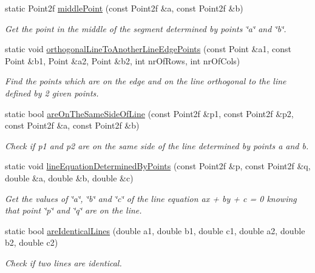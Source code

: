 \begin{DoxyCompactItemize}
static Point2f \hyperlink{classmultiscale_1_1Geometry2D_a178c13bdb5cc3f26de7d5e9fd05781f5}{middle\-Point} (const Point2f \&a, const Point2f \&b)
\begin{DoxyCompactList}\small\item\em Get the point in the middle of the segment determined by points \char`\"{}a\char`\"{} and \char`\"{}b\char`\"{}. \end{DoxyCompactList}\item 
static void \hyperlink{classmultiscale_1_1Geometry2D_a3da27e8cecb0a0d2733afa85d356a912}{orthogonal\-Line\-To\-Another\-Line\-Edge\-Points} (const Point \&a1, const Point \&b1, Point \&a2, Point \&b2, int nr\-Of\-Rows, int nr\-Of\-Cols)
\begin{DoxyCompactList}\small\item\em Find the points which are on the edge and on the line orthogonal to the line defined by 2 given points. \end{DoxyCompactList}\item 
static bool \hyperlink{classmultiscale_1_1Geometry2D_a828b7b579420ac06dabd7c4ba4d081ae}{are\-On\-The\-Same\-Side\-Of\-Line} (const Point2f \&p1, const Point2f \&p2, const Point2f \&a, const Point2f \&b)
\begin{DoxyCompactList}\small\item\em Check if p1 and p2 are on the same side of the line determined by points a and b. \end{DoxyCompactList}\item 
static void \hyperlink{classmultiscale_1_1Geometry2D_a6d72740d7f1b2441b0829c0f0c6a6853}{line\-Equation\-Determined\-By\-Points} (const Point2f \&p, const Point2f \&q, double \&a, double \&b, double \&c)
\begin{DoxyCompactList}\small\item\em Get the values of \char`\"{}a\char`\"{}, \char`\"{}b\char`\"{} and \char`\"{}c\char`\"{} of the line equation ax + by + c = 0 knowing that point \char`\"{}p\char`\"{} and \char`\"{}q\char`\"{} are on the line. \end{DoxyCompactList}\item 
static bool \hyperlink{classmultiscale_1_1Geometry2D_aaa19f84365e924bacfad4ea893875a42}{are\-Identical\-Lines} (double a1, double b1, double c1, double a2, double b2, double c2)
\begin{DoxyCompactList}\small\item\em Check if two lines are identical. \end{DoxyCompactList}\item 

\end{DoxyCompactItemize}

